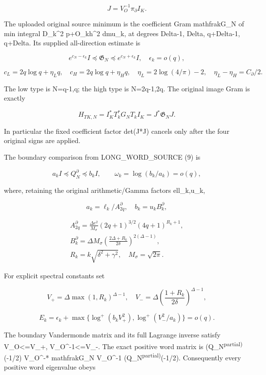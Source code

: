 \documentclass[11pt]{article}
\begin{document}
\[
J=V_O^{-1}\pi_\partial I_K.
\]

The uploaded original source minimum is the coefficient Gram mathfrakG\_N of min integral \textbar D\_k\textbar\^{}2 \textbar p+O\_kh\textbar\^{}2 dmu\_k, at degrees Delta-1, Delta, q+Delta-1, q+Delta. Its supplied all-direction estimate is

\[
e^{c_N-\epsilon_k}I\preceq\mathfrak G_N\preceq e^{c_N+\epsilon_k}I,
\quad\epsilon_k=o(q),
\]

\[
c_L=2q\log q+\eta_Lq,\quad c_H=2q\log q+\eta_Hq,
\quad\eta_L=2\log(4/\pi)-2,\quad\eta_L-\eta_H=C_\partial/2.
\tag{PR18}
\]

The low type is N=q-1,q; the high type is N=2q-1,2q. The original image Gram is exactly

\[
H_{TK,N}=I_K^*T_k^*G_NT_kI_K=J^*\mathfrak G_NJ.
\tag{PR19}
\]

In particular the fixed coefficient factor det(J*J) cancels only after the four original signs are applied.

The boundary comparison from LONG\_WORD\_SOURCE (9) is

\[
a_k I\preceq Q_N^\partial\preceq b_kI,\qquad
\omega_k=\log(b_k/a_k)=o(q),
\tag{PR20}
\]

where, retaining the original arithmetic/Gamma factors ell\_k,u\_k,

\[
a_k=\ell_k/A^\partial_{2q},\quad b_k=u_k B_k^\partial,
\]

\[
\begin{gathered}
A^\partial_{2q}=\frac{\Delta e^2}{M_\sigma}(2q+1)^{3/2}(4q+1)^{R_k+1},\\
B_k^\partial=\Delta M_\sigma\left(\frac{2\Delta+R_k}{2\delta}\right)^{2(\Delta-1)},\\
R_k=k\sqrt{\delta^2+\gamma^2},\quad M_\sigma=\sqrt{2\pi}.
\end{gathered}
\]

For explicit spectral constants set

\[
V_+=\Delta\max(1,R_k)^{\Delta-1},\quad
V_-=\Delta\left(\frac{1+R_k}{2\delta}\right)^{\Delta-1},
\]

\[
E_k=\epsilon_k+
\max\{\log^+(b_kV_+^2),\log^+(V_-^2/a_k)\}=o(q).
\tag{PR21}
\]

The boundary Vandermonde matrix and its full Lagrange inverse satisfy \textbar\textbar V\_O\textbar\textbar\textless=V\_+, \textbar\textbar V\_O\^{}-1\textbar\textbar\textless=V\_-. The exact positive word matrix is (Q\_N\textsuperscript{partial)}(-1/2) V\_O\^{}-* mathfrakG\_N V\_O\^{}-1 (Q\_N\textsuperscript{partial)}(-1/2). Consequently every positive word eigenvalue obeys
\end{document}

